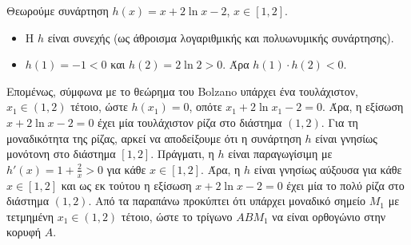 \begin{alist}
Θεωρούμε συνάρτηση $h(x) = x + 2\ln x - 2$, $x \in [1,2]$.
\begin{itemize}
    \item Η $h$ είναι συνεχής (ως άθροισμα λογαριθμικής και πολυωνυμικής συνάρτησης).
    \item $h(1) = -1 < 0$ και $h(2) = 2\ln 2 > 0$. Άρα $h(1) \cdot h(2) < 0$.
\end{itemize}
Επομένως, σύμφωνα με το θεώρημα του Bolzano υπάρχει ένα τουλάχιστον, $x_1 \in (1,2)$ τέτοιο, ώστε $h(x_1) = 0$, οπότε $x_1 + 2\ln x_1 - 2 = 0$.
Άρα, η εξίσωση $x + 2\ln x - 2 = 0$ έχει μία τουλάχιστον ρίζα στο διάστημα $(1,2)$.
Για τη μοναδικότητα της ρίζας, αρκεί να αποδείξουμε ότι η συνάρτηση $h$ είναι γνησίως μονότονη στο διάστημα $[1,2]$.
Πράγματι, η $h$ είναι παραγωγίσιμη με $h'(x) = 1 + \frac{2}{x} > 0$ για κάθε $x \in [1,2]$.
Άρα, η $h$ είναι γνησίως αύξουσα για κάθε $x \in [1,2]$ και ως εκ τούτου η εξίσωση $x + 2\ln x - 2 = 0$ έχει μία το πολύ ρίζα στο διάστημα $(1,2)$.
Από τα παραπάνω προκύπτει ότι υπάρχει μοναδικό σημείο $M_1$ με τετμημένη $x_1 \in (1,2)$ τέτοιο, ώστε το τρίγωνο $ABM_1$ να είναι ορθογώνιο στην κορυφή $A$. 
\end{alist}